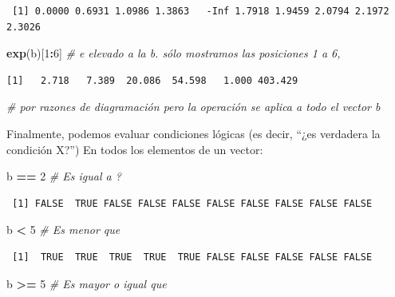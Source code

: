 \documentclass[12pt,spanish,]{book}
\newenvironment{Shaded}{\begin{snugshade}}{\end{snugshade}}
\newcommand{\CommentTok}[1]{\textcolor[rgb]{0.56,0.35,0.01}{\textit{#1}}}
\newcommand{\DecValTok}[1]{\textcolor[rgb]{0.00,0.00,0.81}{#1}}
\newcommand{\KeywordTok}[1]{\textcolor[rgb]{0.13,0.29,0.53}{\textbf{#1}}}
\newcommand{\NormalTok}[1]{#1}
\newcommand{\OperatorTok}[1]{\textcolor[rgb]{0.81,0.36,0.00}{\textbf{#1}}}
\newcommand{\StringTok}[1]{\textcolor[rgb]{0.31,0.60,0.02}{#1}}
\begin{document}
\begin{verbatim}
 [1] 0.0000 0.6931 1.0986 1.3863   -Inf 1.7918 1.9459 2.0794 2.1972 2.3026
\end{verbatim}

\begin{Shaded}
\begin{Highlighting}[]
\KeywordTok{exp}\NormalTok{(b)[}\DecValTok{1}\OperatorTok{:}\DecValTok{6}\NormalTok{]       }\CommentTok{# e elevado a la b. sólo mostramos las posiciones 1 a 6,   }
\end{Highlighting}
\end{Shaded}

\begin{verbatim}
[1]   2.718   7.389  20.086  54.598   1.000 403.429
\end{verbatim}

\begin{Shaded}
\begin{Highlighting}[]
\CommentTok{# por razones de diagramación pero la operación se  aplica a todo el vector b}
\end{Highlighting}
\end{Shaded}

Finalmente, podemos evaluar condiciones lógicas (es decir, ``¿es verdadera la condición X?'') En todos los elementos de un vector:

\begin{Shaded}
\begin{Highlighting}[]
\NormalTok{b }\OperatorTok{==}\StringTok{ }\DecValTok{2}                     \CommentTok{# Es igual a ?}
\end{Highlighting}
\end{Shaded}

\begin{verbatim}
 [1] FALSE  TRUE FALSE FALSE FALSE FALSE FALSE FALSE FALSE FALSE
\end{verbatim}

\begin{Shaded}
\begin{Highlighting}[]
\NormalTok{b }\OperatorTok{<}\StringTok{ }\DecValTok{5}                      \CommentTok{# Es menor que}
\end{Highlighting}
\end{Shaded}

\begin{verbatim}
 [1]  TRUE  TRUE  TRUE  TRUE  TRUE FALSE FALSE FALSE FALSE FALSE
\end{verbatim}

\begin{Shaded}
\begin{Highlighting}[]
\NormalTok{b }\OperatorTok{>=}\StringTok{ }\DecValTok{5}                     \CommentTok{# Es mayor o igual que}
\end{Highlighting}
\end{Shaded}
\end{document}
